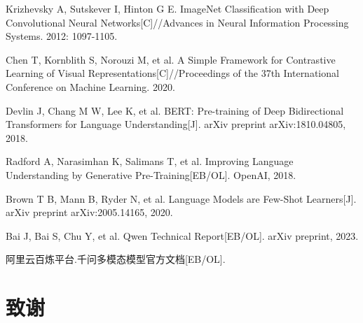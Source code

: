 {\begin{chineseenum}[label=\arabic*.]
  \item Krizhevsky A, Sutskever I, Hinton G E. ImageNet Classification with Deep Convolutional Neural Networks[C]//Advances in Neural Information Processing Systems. 2012: 1097-1105.
  \item Chen T, Kornblith S, Norouzi M, et al. A Simple Framework for Contrastive Learning of Visual Representations[C]//Proceedings of the 37th International Conference on Machine Learning. 2020.
  \item Devlin J, Chang M W, Lee K, et al. BERT: Pre-training of Deep Bidirectional Transformers for Language Understanding[J]. arXiv preprint arXiv:1810.04805, 2018.
  \item Radford A, Narasimhan K, Salimans T, et al. Improving Language Understanding by Generative Pre-Training[EB/OL]. OpenAI, 2018.
  \item Brown T B, Mann B, Ryder N, et al. Language Models are Few-Shot Learners[J]. arXiv preprint arXiv:2005.14165, 2020.
  \item Bai J, Bai S, Chu Y, et al. Qwen Technical Report[EB/OL]. arXiv preprint, 2023.
  \item 阿里云百炼平台.千问多模态模型官方文档[EB/OL].
\end{chineseenum}
}

\chapter*{致谢}

